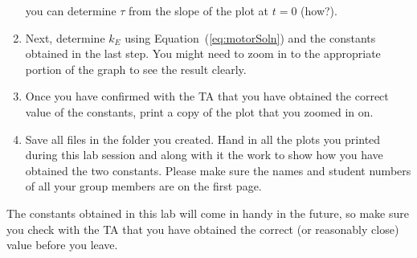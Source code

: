 \begin{enumerate}
you can determine $\tau$ from the slope of the plot at $t=0$ (how?).
\item Next, determine $k_{E}$ using Equation~(\ref{eq:motorSoln}) and the
constants obtained in the last step.  You might need to zoom in to the
appropriate portion of the graph to see the result clearly.
\item Once you have confirmed with the TA that you have obtained the correct
value of the constants, print a copy of the plot that you zoomed in on.
\item Save all files in the folder you created.  Hand in all the plots you
printed during this lab session and along with it the work to show how you
have obtained the two constants.  Please make sure the names and student
numbers of all your group members are on the first page.
\end{enumerate}
The constants obtained in this lab will come in handy in the future, so make
sure you check with the TA that you have obtained the correct (or reasonably
close) value before you leave.


